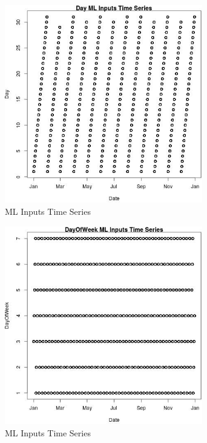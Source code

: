 \begin{figure} 
\centering  
\includegraphics[width=0.77\textwidth]{Code_Outputs/Report_ML_input_PM25_Step4_part_e_de_duplicated_aves_DayvDate.jpg} 
\caption{\label{fig:Report_ML_input_PM25_Step4_part_e_de_duplicated_avesDayvDate}ML Inputs Time Series} 
\end{figure} 
 

\clearpage 

\begin{figure} 
\centering  
\includegraphics[width=0.77\textwidth]{Code_Outputs/Report_ML_input_PM25_Step4_part_e_de_duplicated_aves_DayOfWeekvDate.jpg} 
\caption{\label{fig:Report_ML_input_PM25_Step4_part_e_de_duplicated_avesDayOfWeekvDate}ML Inputs Time Series} 
\end{figure} 
 

